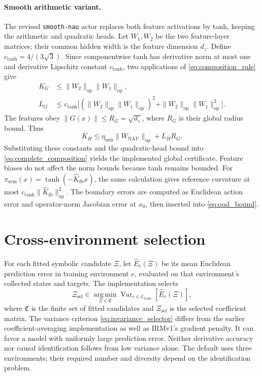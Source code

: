 \paragraph{Smooth arithmetic variant.}
The revised \texttt{smooth-nau} actor replaces both feature activations by
tanh, keeping the arithmetic and quadratic heads. Let \(W_1,W_2\) be the
two feature-layer matrices; their common hidden width is the feature
dimension \(d_z\). Define \(c_{\tanh}=4/(3\sqrt3)\). Since componentwise tanh has
derivative norm at most one and derivative Lipschitz constant
\(c_{\tanh}\), two applications of \eqref{eq:composition_rule} give
\[
\begin{aligned}
K_G&\leq\|W_2\|_{\mathrm{op}}\|W_1\|_{\mathrm{op}},\\
L_G&\leq c_{\tanh}\big[(\|W_2\|_{\mathrm{op}}\|W_1\|_{\mathrm{op}})^2
+\|W_2\|_{\mathrm{op}}\|W_1\|_{\mathrm{op}}^2\big].
\end{aligned}
\]
The features obey \(\|G(x)\|\leq R_G=\sqrt{d_z}\), where
\(R_G\) is their global radius bound. Thus
\[
K_H\leq\eta_{\mathrm{mix}}\|W_{\mathrm{NAU}}\|_{\mathrm{op}}+L_HR_G.
\]
Substituting these constants and the quadratic-head bound into
\eqref{eq:complete_composition} yields the implemented global certificate.
Feature biases do not affect the norm bounds because tanh remains bounded.
For \(\pi_{\mathrm{sym}}(x)=\tanh(-\widehat K_{\mathrm{fb}}x)\), the same
calculation gives reference curvature at most
\(c_{\tanh}\|\widehat K_{\mathrm{fb}}\|_{\mathrm{op}}^2\).
The boundary errors are computed as Euclidean action error and operator-norm
Jacobian error at \(x_0\), then inserted into \eqref{eq:ood_bound}.

\section{Cross-environment selection}
\label{app:irm_protocol}

For each fitted symbolic candidate \(\Xi\), let
\(\widehat E_e(\Xi)\) be its mean Euclidean prediction error in training
environment \(e\), evaluated on that environment's collected states and
targets. The implementation selects
\begin{equation}
\Xi_{\mathrm{sel}}\in
\operatorname*{arg\,min}_{\Xi\in\mathfrak C}
\operatorname{Var}_{e\in\mathcal E_{\mathrm{train}}}
[\widehat E_e(\Xi)],
\label{eq:invariance_selector}
\end{equation}
where \(\mathfrak C\) is the finite set of fitted candidates and
\(\Xi_{\mathrm{sel}}\) is the selected coefficient matrix.
The variance criterion \eqref{eq:invariance_selector} differs from
the earlier coefficient-averaging implementation as well as
IRMv1's gradient penalty. It can favor a model with uniformly large
prediction error. Neither derivative accuracy nor causal identification
follows from low variance alone. The default uses three environments;
their required number and diversity depend on the identification problem.

